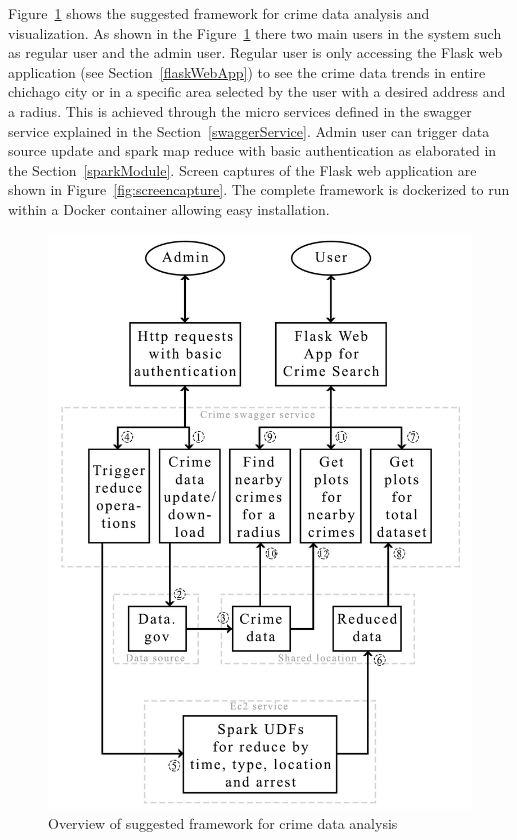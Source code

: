 Figure~\ref{fig:overview} shows the suggested framework for crime data
analysis and visualization.  As shown in the Figure~\ref{fig:overview}
there two main users in the system such as regular user and the admin
user. Regular user is only accessing the Flask web application (see
Section~\ref{flaskWebApp}) to see the crime data trends in entire
chichago city or in a specific area selected by the user with a
desired address and a radius. This is achieved through the micro
services defined in the swagger service explained in the
Section~\ref{swaggerService}. Admin user can trigger data source
update and spark map reduce with basic authentication as elaborated in
the Section~\ref{sparkModule}. Screen captures of the Flask web
application are shown in Figure~\ref{fig:screencapture}. The complete
framework is dockerized to run within a Docker container allowing easy
installation.

\begin{figure}[htb]
	\centering\includegraphics[width=\columnwidth]
        {images/overview.jpg}
	\caption{Overview
		of suggested framework for crime data
		analysis}\label{fig:overview}
\end{figure}

